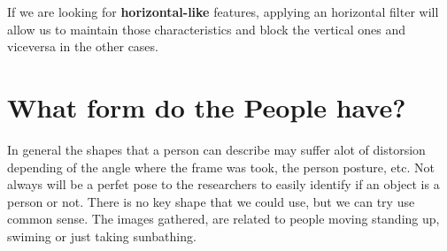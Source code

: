 \documentclass[11pt]{article}
\begin{document}
If we are looking for \textbf{horizontal-like} features, applying an horizontal filter will allow us to maintain those characteristics and block the vertical ones and viceversa in the other cases.


\section{What form do the People have?}

In general the shapes that a person can describe may suffer alot of distorsion depending of the angle where the frame was took, the person posture, etc. Not always will be a perfet pose to the researchers to easily identify if an object is a person or not. There is no key shape that we could use, but we can try use common sense. The images gathered, are related to people moving standing up, swiming or just taking sunbathing.
\end{document}
